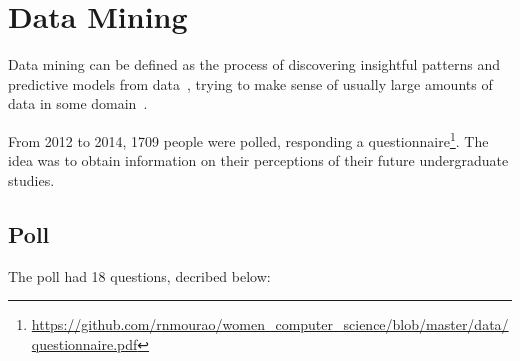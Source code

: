 \section{Data Mining}\label{sec:mining}%

Data mining can be defined as the process of discovering insightful patterns and predictive models from data~\cite{Zaki2014}, trying to make sense of usually large amounts of data in some domain~\cite{Cios2007}. 

From 2012 to 2014, 1709 people were polled, responding a questionnaire\footnote{\url{https://github.com/rnmourao/women\_computer\_science/blob/master/data/questionnaire.pdf}}. The idea was to obtain information on their perceptions of their future undergraduate studies.

\subsection{Poll}\label{sec:mining:poll}%
The poll had 18 questions, decribed below:

